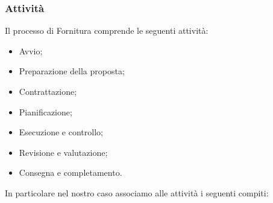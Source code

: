 \subsubsection{Attività} 
Il processo di Fornitura comprende le seguenti attività:
\begin{itemize}
	\item Avvio;
	\item Preparazione della proposta;
	\item Contrattazione;
	\item Pianificazione;
	\item Esecuzione e controllo;
	\item Revisione e valutazione;
	\item Consegna e completamento.
\end{itemize}
In particolare nel nostro caso associamo alle attività i seguenti compiti:
